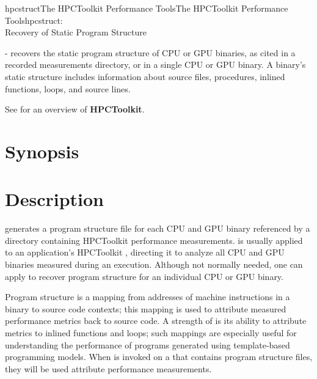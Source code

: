 \documentclass[english]{article}
\begin{document}
\begin{Name}{1}{hpcstruct}{The HPCToolkit Performance Tools}{The HPCToolkit Performance Tools}{hpcstruct:\\ Recovery of Static Program Structure}

 - recovers the static program structure of CPU or GPU binaries, as cited in a recorded
measurements directory, or in a single CPU or GPU binary.
A binary's static structure includes information about source files, procedures,
inlined functions, loops, and source lines.

See  for an overview of \textbf{HPCToolkit}.

\end{Name}

\section{Synopsis}

  

  

\section{Description}

 generates a program structure file for each CPU and GPU
binary referenced by a directory containing HPCToolkit performance
measurements.
 is usually applied to an application's HPCToolkit , directing
it to analyze all CPU and GPU binaries measured during an execution.
Although not normally needed, one can apply  to recover program
structure for an individual CPU or GPU binary.

Program structure is a mapping from addresses of machine instructions
in a binary to source code contexts; this mapping is used to attribute
measured performance metrics back to source code. A strength of
 is its ability to attribute metrics to inlined functions
and loops; such mappings are especially useful for understanding the
performance of programs generated using template-based programming
models.
When  is invoked on a  that contains program structure files,
they will be used attribute performance measurements.
\end{document}
